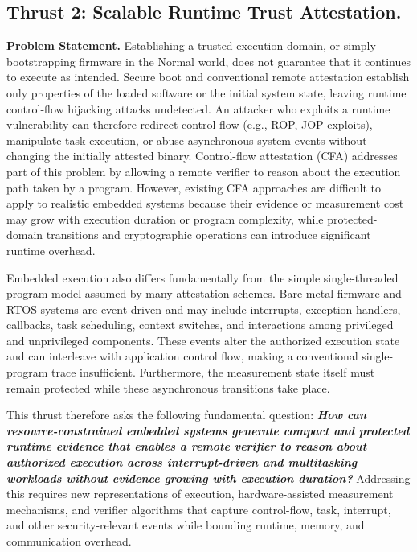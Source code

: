 \subsection{Thrust 2: Scalable Runtime Trust Attestation.}
\label{sb:t2}

\textbf{Problem Statement.}
Establishing a trusted execution domain, or simply bootstrapping firmware in the Normal world, does not guarantee that it continues to execute as intended.
Secure boot and conventional remote attestation establish only properties of the loaded software or the initial system state, leaving runtime control-flow hijacking attacks undetected.
An attacker who exploits a runtime vulnerability can therefore redirect control flow (e.g., ROP, JOP exploits), manipulate task execution, or abuse asynchronous system events without changing the initially attested binary.
Control-flow attestation (CFA) addresses part of this problem by allowing a remote verifier to reason about the execution path taken by a program.
However, existing CFA approaches are difficult to apply to realistic embedded systems because their evidence or measurement cost may grow with execution duration or program complexity, while protected-domain transitions and cryptographic operations can introduce significant runtime overhead.

Embedded execution also differs fundamentally from the simple single-threaded program model assumed by many attestation schemes.
Bare-metal firmware and RTOS systems are event-driven and may include interrupts, exception handlers, callbacks, task scheduling, context switches, and interactions among privileged and unprivileged components.
These events alter the authorized execution state and can interleave with application control flow, making a conventional single-program trace insufficient.
Furthermore, the measurement state itself must remain protected while these asynchronous transitions take place.

This thrust therefore asks the following fundamental question:
\textbf{\textit{How can resource-constrained embedded systems generate compact and protected runtime evidence that enables a remote verifier to reason about authorized execution across interrupt-driven and multitasking workloads without evidence growing with execution duration?}}
Addressing this requires new representations of execution, hardware-assisted measurement mechanisms, and verifier algorithms that capture
control-flow, task, interrupt, and other security-relevant events while bounding runtime, memory, and communication overhead.


